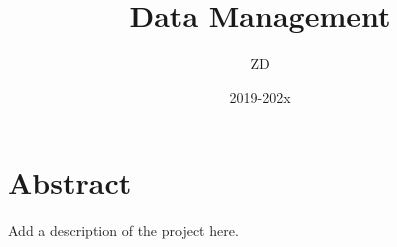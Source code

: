 \documentclass[12pt,oneside]{book}
\title{Data Management}
\author{ZD}
\date{2019-202x}
\begin{document}
    
\frontmatter

\maketitle

\chapter*{Abstract}
Add a description of the project here.  

\tableofcontents

\listoffigures

\listoftables

\mainmatter








\end{document}
